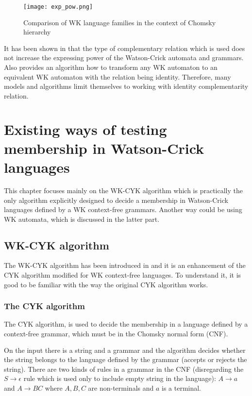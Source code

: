 \begin{figure}[ht]
  \texttt{[image: exp\_pow.png]}
  \centering
  \label{fig:expr-power}
  \caption{Comparison of WK language families in the context of Chomsky hierarchy}
\end{figure}

It has been shown in \cite{COMPL_REL} that the type of complementary relation which is used does not increase the expressing power of the Watson-Crick automata and grammars. Also \cite{SURVEY} provides an algorithm how to transform any WK automaton to an equivalent WK automaton with the relation being identity. Therefore, many models and algorithms limit themselves to working with identity complementarity relation.

\chapter{Existing ways of testing membership in Watson-Crick languages} \label{chapter:WK_CYK}

This chapter focuses mainly on the WK-CYK algorithm which is practically the only algorithm explicitly designed to decide a membership in Watson-Crick languages defined by a WK context-free grammars. Another way could be using WK automata, which is discussed in the latter part.

\section{WK-CYK algorithm}
The WK-CYK algorithm has been introduced in \cite{WK_CYK} and it is an enhancement of the CYK algorithm modified for WK context-free languages. To understand it, it is good to be familiar with the way the original CYK algorithm works.

\subsection{The CYK algorithm}
The CYK algorithm, is used to decide the membership in a language defined by a context-free grammar, which must be in the Chomsky normal form (CNF).

On the input there is a string and a grammar and the algorithm decides whether the string belongs to the language defined by the grammar (accepts or rejects the string). There are two kinds of rules in a grammar in the CNF (disregarding the $S \rightarrow \epsilon$ rule which is used only to include empty string in the language): $A \rightarrow a$ and $A \rightarrow BC$ where $A, B, C$ are non-terminals and $a$ is a terminal.

